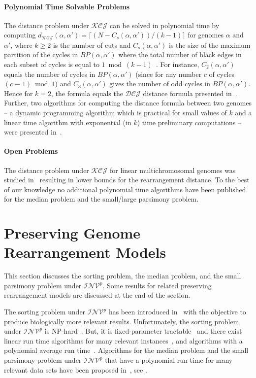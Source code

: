 \documentclass{svmult}
\newcommand{\m}[1]{\mathcal{#1}}
\begin{document}
\paragraph{Polynomial Time Solvable Problems}

The distance problem under $\m{KCJ}$ can be solved in polynomial time 
by computing
$d_{\m{KCJ}}(\alpha,\alpha')=\lceil(N-C_s(\alpha,\alpha'))/(k-1)\rceil$ for
genomes $\alpha$ and $\alpha'$, where $k\geq 2$ is the number of cuts and
$C_s(\alpha,\alpha')$ is the size of the maximum partition of the cycles in
$BP(\alpha,\alpha')$ where the total number of black edges in each subset of
cycles is equal to $1 \bmod{(k-1)}$~\cite{Alekseyev_2008}.
For instance, $C_2(\alpha,\alpha')$ equals the number of cycles in $BP(\alpha,\alpha')$ (since
for any number $c$ of cycles $(c\equiv 1)\bmod{1}$) and $C_3(\alpha,\alpha')$
gives the number of odd cycles in $BP(\alpha,\alpha')$.
Hence for $k=2$, the formula equals the $\m{DCJ}$ distance formula presented in~\cite{Yancopoulos_2005}. 
Further, two algorithms for computing the distance formula between two genomes -- a dynamic programming algorithm 
which is practical for small values of
$k$ and a linear time algorithm with exponential (in
$k$) time preliminary computations -- were presented in~\cite{Alekseyev_2008}.


\paragraph{Open Problems}
The distance problem under $\m{KCJ}$ for linear multichromosomal
genomes was studied in~\cite{Alekseyev_2008b} resulting in lower bounds for the
rearrangement distance. To the best of our knowledge no additional polynomial time algorithms have been published for 
the median problem and the small/large parsimony problem.




\section{Preserving Genome Rearrangement Models}
\label{sec:preserving_models}


This section discusses the sorting problem, the median problem, and the small parsimony problem under $\m{INV}^{p}$. 
Some results for related preserving rearrangement models are discussed at the end of the section.

The sorting problem under $\m{INV}^{p}$ has been introduced in~\cite{Figeac_2004} with the objective to 
produce biologically more relevant results.
%
Unfortunately, the sorting problem under $\m{INV}^{p}$ is NP-hard~\cite{Figeac_2004}. But, it is 
fixed-parameter tractable~\cite{Bouvel_2011} 
and there exist linear run time algorithms for many relevant instances~\cite{Berard_2007,Berard_2008b}, and 
algorithms with a polynomial average run time~\cite{Bouvel_2011}.
% 
Algorithms for the median problem and the small parsimony problem under $\m{INV}^{p}$ that have a polynomial run time 
for many relevant data sets have been proposed in~\cite{Bernt_2012,Bernt_2008}, see .
\end{document}
